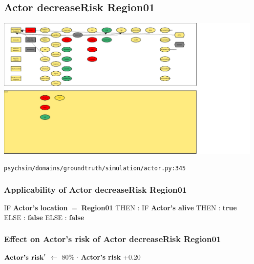 \documentclass{article}%
\begin{document}
\subsection{Actor decreaseRisk Region01}%
\label{subsec:Actor decreaseRisk Region01}%
\includegraphics[width=\textwidth]{images/Actor-decreaseRisk-Region01.png}%
\begin{flushleft}%
\verb|psychsim/domains/groundtruth/simulation/actor.py:345|%
\end{flushleft}%
\subsubsection{Applicability of Actor decreaseRisk Region01}%
\label{ssubsec:Applicability of Actor decreaseRisk Region01}%
\begin{flushleft}%
IF %
\textbf{Actor's location}%
$=$%
\textbf{Region01}%
\linebreak%
\hspace*{2em}%
THEN %
: %
IF %
\textbf{Actor's alive}%
\linebreak%
\hspace*{4em}%
THEN %
: %
\textbf{true}%
\linebreak%
\hspace*{4em}%
ELSE %
: %
\textbf{false}%
\linebreak%
\hspace*{2em}%
ELSE %
: %
\textbf{false}%
\end{flushleft}

%
\subsubsection{Effect on Actor's risk of Actor decreaseRisk Region01}%
\label{ssubsec:Effect on Actor's risk of Actor decreaseRisk Region01}%
\begin{flushleft}%
$\mbox{\textbf{Actor's risk}} '$%
$\leftarrow$%
80\%%
$\cdot$%
\textbf{Actor's risk}%
+0.20%
\end{flushleft}
\end{document}
